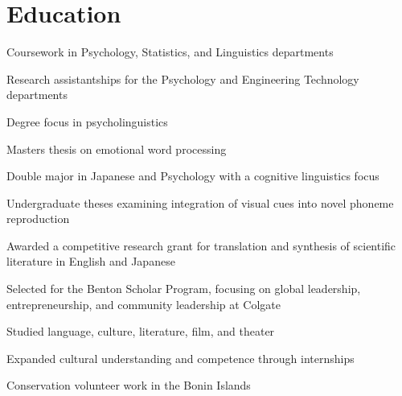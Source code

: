 \documentclass[letterpaper]{deedy-resume} %
\begin{document}
\section{Education}
\vspace{\topsep} %
\begin{tightitemize}
\item Coursework in Psychology, Statistics, and Linguistics departments
\item Research assistantships for the Psychology and Engineering Technology departments
\item Degree focus in psycholinguistics
\item Masters thesis on emotional word processing
\end{tightitemize}
\sectionspace %
\vspace{\topsep} %
\begin{tightitemize}
\item Double major in Japanese and Psychology with a cognitive linguistics focus
\item Undergraduate theses examining integration of visual cues into novel phoneme reproduction
\item Awarded a competitive research grant for translation and synthesis of scientific literature in English and Japanese
\item Selected for the Benton Scholar Program, focusing on global leadership, entrepreneurship, and community leadership at Colgate
\end{tightitemize}
\sectionspace %
\vspace{\topsep} %
\begin{tightitemize}
\item Studied language, culture, literature, film, and theater
\item Expanded cultural understanding and competence through internships
\item Conservation volunteer work in the Bonin Islands
\end{tightitemize}
\end{document}
